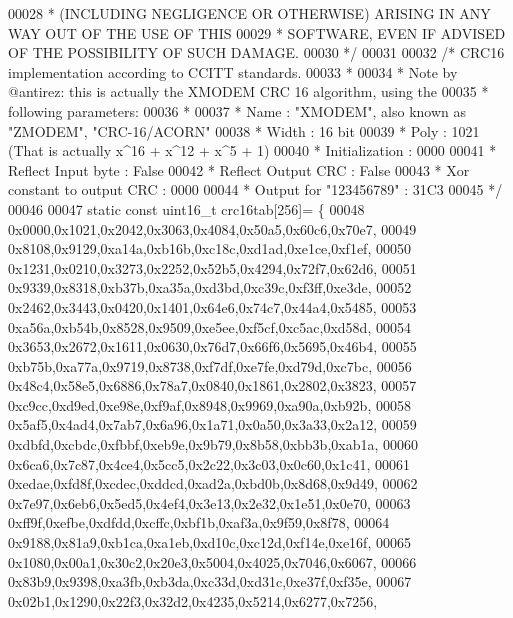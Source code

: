 \begin{DoxyCode}
00028 \textcolor{comment}{ * (INCLUDING NEGLIGENCE OR OTHERWISE) ARISING IN ANY WAY OUT OF THE USE OF THIS}
00029 \textcolor{comment}{ * SOFTWARE, EVEN IF ADVISED OF THE POSSIBILITY OF SUCH DAMAGE.}
00030 \textcolor{comment}{ */}
00031 
00032 \textcolor{comment}{/* CRC16 implementation according to CCITT standards.}
00033 \textcolor{comment}{ *}
00034 \textcolor{comment}{ * Note by @antirez: this is actually the XMODEM CRC 16 algorithm, using the}
00035 \textcolor{comment}{ * following parameters:}
00036 \textcolor{comment}{ *}
00037 \textcolor{comment}{ * Name                       : "XMODEM", also known as "ZMODEM", "CRC-16/ACORN"}
00038 \textcolor{comment}{ * Width                      : 16 bit}
00039 \textcolor{comment}{ * Poly                       : 1021 (That is actually x^16 + x^12 + x^5 + 1)}
00040 \textcolor{comment}{ * Initialization             : 0000}
00041 \textcolor{comment}{ * Reflect Input byte         : False}
00042 \textcolor{comment}{ * Reflect Output CRC         : False}
00043 \textcolor{comment}{ * Xor constant to output CRC : 0000}
00044 \textcolor{comment}{ * Output for "123456789"     : 31C3}
00045 \textcolor{comment}{ */}
00046 
00047 \textcolor{keyword}{static} \textcolor{keyword}{const} uint16\_t crc16tab[256]= \{
00048     0x0000,0x1021,0x2042,0x3063,0x4084,0x50a5,0x60c6,0x70e7,
00049     0x8108,0x9129,0xa14a,0xb16b,0xc18c,0xd1ad,0xe1ce,0xf1ef,
00050     0x1231,0x0210,0x3273,0x2252,0x52b5,0x4294,0x72f7,0x62d6,
00051     0x9339,0x8318,0xb37b,0xa35a,0xd3bd,0xc39c,0xf3ff,0xe3de,
00052     0x2462,0x3443,0x0420,0x1401,0x64e6,0x74c7,0x44a4,0x5485,
00053     0xa56a,0xb54b,0x8528,0x9509,0xe5ee,0xf5cf,0xc5ac,0xd58d,
00054     0x3653,0x2672,0x1611,0x0630,0x76d7,0x66f6,0x5695,0x46b4,
00055     0xb75b,0xa77a,0x9719,0x8738,0xf7df,0xe7fe,0xd79d,0xc7bc,
00056     0x48c4,0x58e5,0x6886,0x78a7,0x0840,0x1861,0x2802,0x3823,
00057     0xc9cc,0xd9ed,0xe98e,0xf9af,0x8948,0x9969,0xa90a,0xb92b,
00058     0x5af5,0x4ad4,0x7ab7,0x6a96,0x1a71,0x0a50,0x3a33,0x2a12,
00059     0xdbfd,0xcbdc,0xfbbf,0xeb9e,0x9b79,0x8b58,0xbb3b,0xab1a,
00060     0x6ca6,0x7c87,0x4ce4,0x5cc5,0x2c22,0x3c03,0x0c60,0x1c41,
00061     0xedae,0xfd8f,0xcdec,0xddcd,0xad2a,0xbd0b,0x8d68,0x9d49,
00062     0x7e97,0x6eb6,0x5ed5,0x4ef4,0x3e13,0x2e32,0x1e51,0x0e70,
00063     0xff9f,0xefbe,0xdfdd,0xcffc,0xbf1b,0xaf3a,0x9f59,0x8f78,
00064     0x9188,0x81a9,0xb1ca,0xa1eb,0xd10c,0xc12d,0xf14e,0xe16f,
00065     0x1080,0x00a1,0x30c2,0x20e3,0x5004,0x4025,0x7046,0x6067,
00066     0x83b9,0x9398,0xa3fb,0xb3da,0xc33d,0xd31c,0xe37f,0xf35e,
00067     0x02b1,0x1290,0x22f3,0x32d2,0x4235,0x5214,0x6277,0x7256,

\end{DoxyCode}
